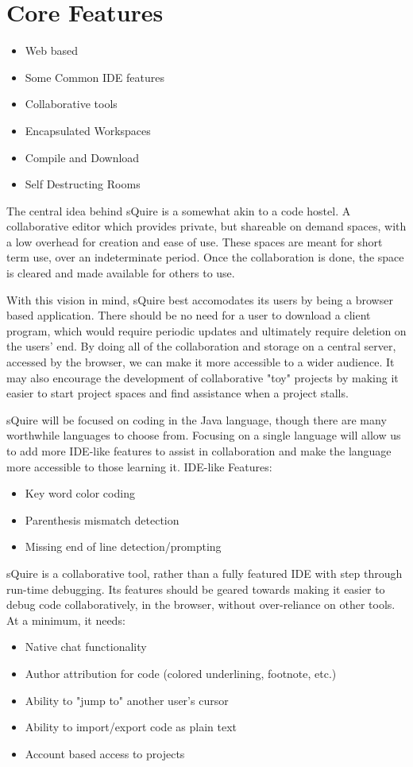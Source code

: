 \documentclass[11pt]{report}
\begin{document}
\section{Core Features}
    \begin{itemize}
      \item Web based
      \item Some Common IDE features
      \item Collaborative tools
      \item Encapsulated Workspaces
      \item Compile and Download
      \item Self Destructing Rooms
    \end{itemize}
    The central idea behind sQuire is a somewhat akin to a code hostel. A collaborative editor which provides private, but shareable on demand spaces, with a low overhead for creation and ease of use. These spaces are meant for short term use, over an indeterminate period. Once the collaboration is done, the space is cleared and made available for others to use.
    
    With this vision in mind, sQuire best accomodates its users by being a browser based application. There should be no need for a user to download a client program, which would require periodic updates and ultimately require deletion on the users' end. By doing all of the collaboration and storage on a central server, accessed by the browser, we can make it more accessible to a wider audience. It may also encourage the development of collaborative "toy" projects by making it easier to start project spaces and find assistance when a project stalls.
    
    sQuire will be focused on coding in the Java language, though there are many worthwhile languages to choose from. Focusing on a single language will allow us to add more IDE-like features to assist in collaboration and make the language more accessible to those learning it.
    IDE-like Features:
    \begin{itemize}
      \item Key word color coding
      \item Parenthesis mismatch detection
      \item Missing end of line detection/prompting
    \end{itemize}
    
    sQuire is a collaborative tool, rather than a fully featured IDE with step through run-time debugging. Its features should be geared towards making it easier to debug code collaboratively, in the browser, without over-reliance on other tools. At a minimum, it needs:
    \begin{itemize}
      \item Native chat functionality
      \item Author attribution for code (colored underlining, footnote, etc.)
      \item Ability to "jump to" another user's cursor
      \item Ability to import/export code as plain text
      \item Account based access to projects
    \end{itemize}
    
\end{document}
